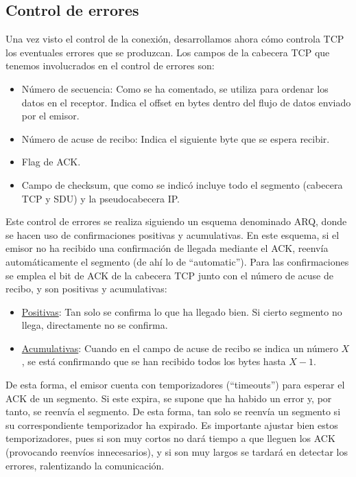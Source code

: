 \subsection{Control de errores}
Una vez visto el control de la conexión, desarrollamos ahora cómo controla \acrshort{TCP} los eventuales errores que se produzcan.
Los campos de la cabecera \acrshort{TCP} que tenemos involucrados en el control de errores son:
\begin{itemize}
    \item Número de secuencia: Como se ha comentado, se utiliza para ordenar los datos en el receptor. Indica el offset en bytes dentro del flujo de datos enviado por el emisor.
    \item Número de acuse de recibo: Indica el siguiente byte que se espera recibir.
    \item Flag de ACK.
    \item Campo de checksum, que como se indicó incluye todo el segmento (cabecera \acrshort{TCP} y \acrshort{SDU}) y la pseudocabecera \acrshort{IP}.
\end{itemize}

Este control de errores se realiza siguiendo un esquema denominado \acrfull{ARQ}, donde se hacen uso de confirmaciones positivas y acumulativas. En este esquema, si el emisor no ha recibido una confirmación de llegada mediante el \acrshort{ACK}, reenvía automáticamente el segmento (de ahí lo de ``automatic''). Para las confirmaciones se emplea el bit de \acrshort{ACK} de la cabecera \acrshort{TCP} junto con el número de acuse de recibo, y son positivas y acumulativas:
\begin{itemize}
    \item \ul{Positivas}: Tan solo se confirma lo que ha llegado bien. Si cierto segmento no llega, directamente no se confirma.
    
    \item \ul{Acumulativas}: Cuando en el campo de acuse de recibo se indica un número $X$, se está confirmando que se han recibido todos los bytes hasta $X-1$.
\end{itemize}

De esta forma, el emisor cuenta con temporizadores (``timeouts'') para esperar el \acrshort{ACK} de un segmento. Si este expira, se supone que ha habido un error y, por tanto, se reenvía el segmento. De esta forma, tan solo se reenvía un segmento si su correspondiente temporizador ha expirado. Es importante ajustar bien estos temporizadores, pues si son muy cortos no dará tiempo a que lleguen los \acrshort{ACK} (provocando reenvíos innecesarios), y si son muy largos se tardará en detectar los errores, ralentizando la comunicación.\\

